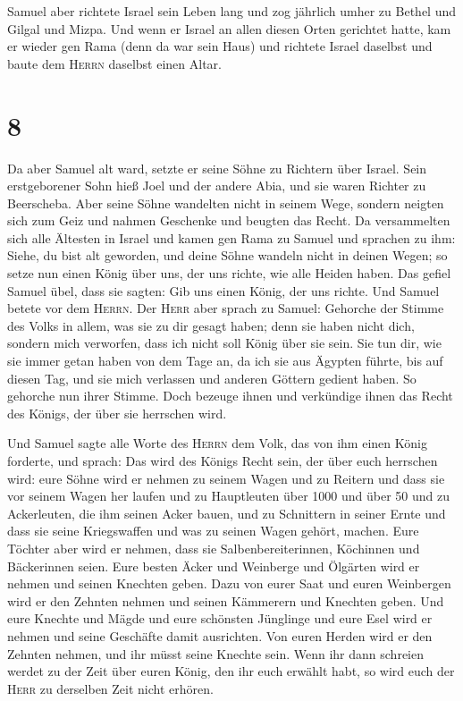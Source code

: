 Samuel aber richtete Israel sein Leben lang
 und zog jährlich umher zu Bethel und Gilgal und Mizpa.
Und wenn er Israel an allen diesen Orten gerichtet hatte,
 kam er wieder gen Rama (denn da war sein Haus) und
richtete Israel daselbst und baute dem \textsc{Herrn} daselbst einen
Altar.

\hypertarget{section-7}{%
\section{8}\label{section-7}}

 Da aber Samuel alt ward, setzte er seine Söhne zu
Richtern über Israel.  Sein erstgeborener Sohn hieß Joel
und der andere Abia, und sie waren Richter zu Beerscheba. 
Aber seine Söhne wandelten nicht in seinem Wege, sondern neigten sich
zum Geiz und nahmen Geschenke und beugten das Recht.  Da
versammelten sich alle Ältesten in Israel und kamen gen Rama zu Samuel
 und sprachen zu ihm: Siehe, du bist alt geworden, und
deine Söhne wandeln nicht in deinen Wegen; so setze nun einen König über
uns, der uns richte, wie alle Heiden haben.  Das gefiel
Samuel übel, dass sie sagten: Gib uns einen König, der uns richte. Und
Samuel betete vor dem \textsc{Herrn}.  Der \textsc{Herr}
aber sprach zu Samuel: Gehorche der Stimme des Volks in allem, was sie
zu dir gesagt haben; denn sie haben nicht dich, sondern mich verworfen,
dass ich nicht soll König über sie sein.  Sie tun dir, wie
sie immer getan haben von dem Tage an, da ich sie aus Ägypten führte,
bis auf diesen Tag, und sie mich verlassen und anderen Göttern gedient
haben.  So gehorche nun ihrer Stimme. Doch bezeuge ihnen
und verkündige ihnen das Recht des Königs, der über sie herrschen wird.

 Und Samuel sagte alle Worte des \textsc{Herrn} dem Volk,
das von ihm einen König forderte,  und sprach: Das wird
des Königs Recht sein, der über euch herrschen wird: eure Söhne wird er
nehmen zu seinem Wagen und zu Reitern und dass sie vor seinem Wagen her
laufen  und zu Hauptleuten über 1000 und über 50 und zu
Ackerleuten, die ihm seinen Acker bauen, und zu Schnittern in seiner
Ernte und dass sie seine Kriegswaffen und was zu seinen Wagen gehört,
machen.  Eure Töchter aber wird er nehmen, dass sie
Salbenbereiterinnen, Köchinnen und Bäckerinnen seien. 
Eure besten Äcker und Weinberge und Ölgärten wird er nehmen und seinen
Knechten geben.  Dazu von eurer Saat und euren Weinbergen
wird er den Zehnten nehmen und seinen Kämmerern und Knechten geben.
 Und eure Knechte und Mägde und eure schönsten Jünglinge
und eure Esel wird er nehmen und seine Geschäfte damit ausrichten.
 Von euren Herden wird er den Zehnten nehmen, und ihr
müsst seine Knechte sein.  Wenn ihr dann schreien werdet
zu der Zeit über euren König, den ihr euch erwählt habt, so wird euch
der \textsc{Herr} zu derselben Zeit nicht erhören.

